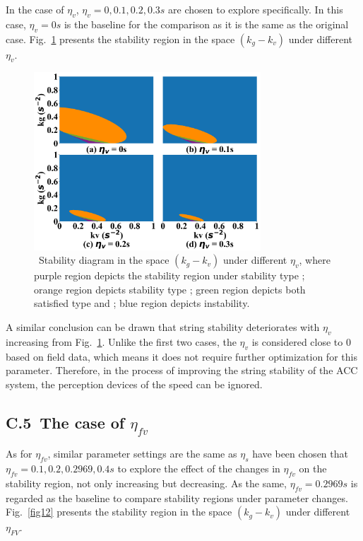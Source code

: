 \documentclass[journal]{IEEEtran}
\begin{document}
In the case of $\eta_v$, $\eta_v=0,0.1,0.2,0.3s$ are chosen to explore specifically. In this case, $\eta_v=0s$ is the baseline for the comparison as it is the same as the original case. Fig.~\ref{fig11} presents the stability region in the space $(k_g-k_v)$ under different $\eta_v$.

\begin{figure}
  \centering
  \includegraphics[width=8.5cm]{figs/fig11.png}
  \caption{~Stability diagram in the space $(k_g-k_v)$ under different $\eta_v$, where purple region depicts the stability region under stability type \uppercase\expandafter{}; orange region depicts stability type \uppercase\expandafter{}; green region depicts both satisfied type \uppercase\expandafter{} and \uppercase\expandafter{}; blue region depicts instability.}
  \label{fig11}
\end{figure}

A similar conclusion can be drawn that string stability deteriorates with $\eta_v$ increasing from Fig.~\ref{fig11}. Unlike the first two cases, the $\eta_v$ is considered close to 0 based on field data, which means it does not require further optimization for this parameter. Therefore, in the process of improving the string stability of the ACC system, the perception devices of the speed can be ignored.

\subsection*{C.5~The case of $\eta_{fv}$}

As for $\eta_{fv}$, similar parameter settings are the same as $\eta_s$ have been chosen that $\eta_{fv}=0.1,0.2,0.2969,0.4s$ to explore the effect of the changes in $\eta_{fv}$ on the stability region, not only increasing but decreasing. As the same, $\eta_{fv}=0.2969s$ is regarded as the baseline to compare stability regions under parameter changes. Fig.~\ref{fig12} presents the stability region in the space $(k_g-k_v)$ under different $\eta_{FV}$.
\end{document}
